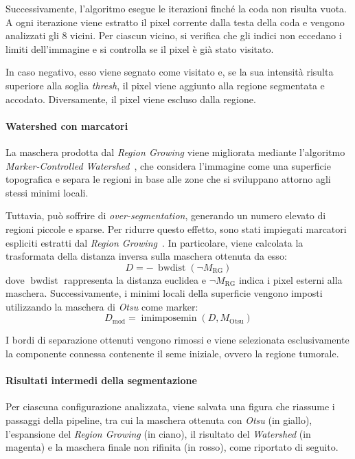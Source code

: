 Successivamente, l’algoritmo esegue le iterazioni finché la coda non risulta vuota. A ogni iterazione viene estratto il pixel corrente dalla testa della coda e vengono analizzati gli 8 vicini. Per ciascun vicino, si verifica che gli indici non eccedano i limiti dell’immagine e si controlla se il pixel è già stato visitato.

In caso negativo, esso viene segnato come visitato e, se la sua intensità risulta superiore alla soglia \textit{thresh}, il pixel viene aggiunto alla regione segmentata e accodato. Diversamente, il pixel viene escluso dalla regione.

\paragraph{Watershed con marcatori}
La maschera prodotta dal \textit{Region Growing} viene migliorata mediante l’algoritmo \textit{Marker-Controlled Watershed}~\cite{vincent1991}, che considera l’immagine come una superficie topografica e separa le regioni in base alle zone che si sviluppano attorno agli stessi minimi locali. 

Tuttavia, può soffrire di \textit{over-segmentation}, generando un numero elevato di regioni piccole e sparse. Per ridurre questo effetto, sono stati impiegati marcatori espliciti estratti dal \textit{Region Growing}~\cite{grau2004}.
In particolare, viene calcolata la trasformata della distanza inversa sulla maschera ottenuta da esso:
\[
D = -\,\operatorname{bwdist}(\neg M_{\text{RG}})
\]
dove $\operatorname{bwdist}$ rappresenta la distanza euclidea e $\neg M_{\text{RG}}$ indica i pixel esterni alla maschera. Successivamente, i minimi locali della superficie vengono imposti utilizzando la maschera di \textit{Otsu} come marker:
\[
D_{\text{mod}} = \operatorname{imimposemin}(D, M_{\text{Otsu}})
\]

I bordi di separazione ottenuti vengono rimossi e viene selezionata esclusivamente la componente connessa contenente il seme iniziale, ovvero la regione tumorale.

\paragraph{Risultati intermedi della segmentazione}
Per ciascuna configurazione analizzata, viene salvata una figura che riassume i passaggi della pipeline, tra cui la maschera ottenuta con \textit{Otsu} (in giallo), l'espansione del \textit{Region Growing} (in ciano), il risultato del \textit{Watershed} (in magenta) e la maschera finale non rifinita (in rosso), come riportato di seguito.

